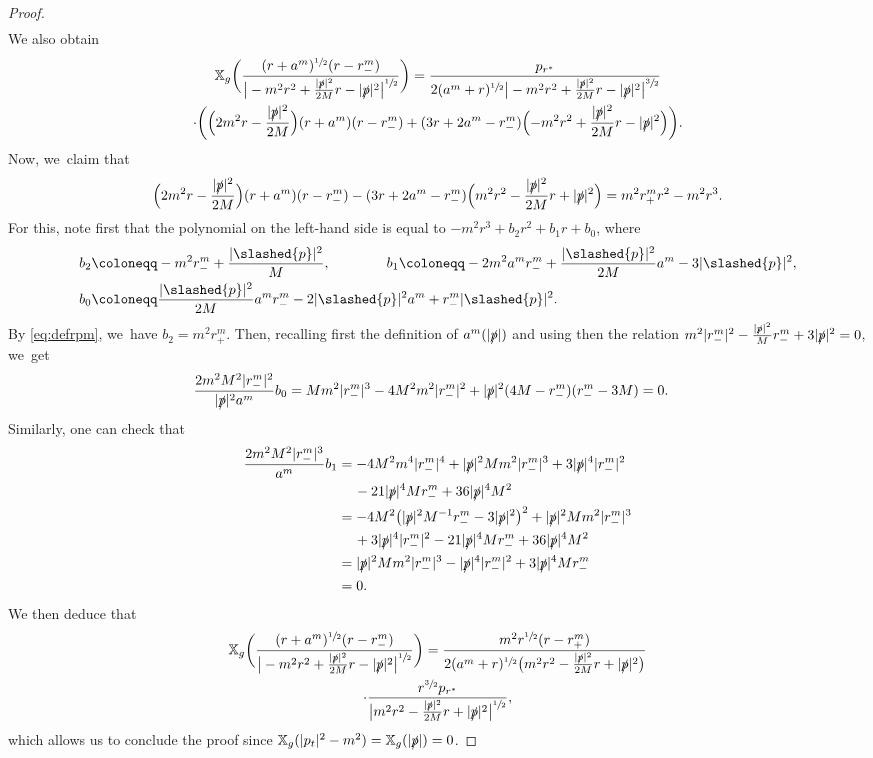 \documentclass[JEP,XML,SOM,Unicode,published]{cedram}
\theoremstyle{plain}
\theoremstyle{definition}
\newcommand\T{{\mathbb{X}}}
\begin{document}
\begin{proof}
\begin{align*}
\end{align*}
We also obtain
\begin{multline*}
\T_g \biggl(\frac{(r+a^{m})^{\sfrac{1}{2}}(r-r_-^m)}{\big| -m^2 r^2+\frac{|\slashed{p}|^2}{2M}r-|\slashed{p}|^2 \big|^{\sfrac{1}{2}}}\biggr)=\frac{p_{r^*} }{2(a^{m}+r)^{\sfrac{1}{2}}\big|-m^2 r^2+\frac{|\slashed{p}|^2}{2M}r-|\slashed{p}|^2\big|^{\sfrac{3}{2}}} \\
\cdot \biggl(\Bigl(2m^2 r-\frac{|\slashed{p}|^2}{2M}\Bigr)(r+a^{m})(r-r^{m}_-)+(3r+2a^{m}-r^{m}_-)\Bigl(-m^2 r^2+\frac{|\slashed{p}|^2}{2M}r-|\slashed{p}|^2\Bigr)\biggr).
\end{multline*}
Now, we~claim that
\[
\Bigl(2m^2 r-\frac{|\slashed{p}|^2}{2M}\Bigr)(r+a^{m})(r-r^{m}_-)-(3r+2a^{m}-r^{m}_-)\Bigl(m^2 r^2-\frac{|\slashed{p}|^2}{2M}r+|\slashed{p}|^2\Bigr)=m^2r^{m}_+r^2-m^2r^3.
\]
For this, note first that the polynomial on the left-hand side is equal to $-m^2r^3+b_2r^2+b_1r+b_0$, where
\begin{align*}
b_2 & \coloneqq -m^2r_-^m+\frac{|\slashed{p}|^2}{M},\qquad\qquad b_1 \coloneqq -2m^2a^mr_-^m+\frac{|\slashed{p}|^2}{2M}a^m -3 |\slashed{p}|^2, \\
b_0 & \coloneqq \frac{|\slashed{p}|^2}{2M}a^mr_-^m-2|\slashed{p}|^2a^m+r_-^m |\slashed{p}|^2.
\end{align*}
By \eqref{eq:defrpm}, we~have $b_2=m^2r_+^m$. Then, recalling first the definition of $a^{m}(|\slashed{p}|)$ and using then the relation $m^2|r_-^m|^2-\frac{|\slashed{p}|^2}{M}r_-^m+3|\slashed{p}|^2=0$, we~get
\begin{align*}
\frac{2m^2M^2|r_-^m|^2}{|\slashed{p}|^2 a^m} b_0 & = M m^2|r_-^m|^3-4M^2m^2|r_-^m|^2+|\slashed{p}|^2(4M-r_-^m)(r_-^m-3M) =0.
\end{align*}
Similarly, one can check that
\begin{align*}
\frac{2m^2M^2|r_-^m|^3}{a^m} b_1 & =-4M^2m^4|r_-^m|^4+|\slashed{p}|^2M m^2|r_-^m|^3+3|\slashed{p}|^4|r_-^m|^2 \\
& \quad \, -21 |\slashed{p}|^4 M r_-^m+36|\slashed{p}|^4 M^2 \\
& = -4M^2 \bigl(|\slashed{p}|^2 M^{-1}r_-^m-3|\slashed{p}|^2 \bigr)^2+|\slashed{p}|^2M m^2|r_-^m|^3 \\
& \quad \, +3|\slashed{p}|^4|r_-^m|^2-21 |\slashed{p}|^4 M r_-^m+36|\slashed{p}|^4 M^2 \\
& = |\slashed{p}|^2M m^2|r_-^m|^3-|\slashed{p}|^4|r_-^m|^2+3 |\slashed{p}|^4 M r_-^m \\
& =0.
\end{align*}
We then deduce that
\begin{multline*}
\T_g \biggl(\frac{(r+a^{m})^{\sfrac{1}{2}}(r-r_-^m)}{\big| -m^2 r^2+\frac{|\slashed{p}|^2}{2M}r-|\slashed{p}|^2 \big|^{\sfrac{1}{2}}}\biggr) = \frac{m^2 r^{\sfrac{1}{2}}(r-r^{m}_+)}{2(a^m+r)^{\sfrac{1}{2}}\bigl(m^2 r^2-\frac{|\slashed{p}|^2}{2M}r+|\slashed{p}|^2 \bigr)} \\
\cdot \frac{r^{\sfrac{3}{2}}p_{r^*}}{\big|m^2r^2-\frac{|\slashed{p}|^2}{2M}r+|\slashed{p}|^2\big|^{\sfrac{1}{2}}},
\end{multline*}
which allows us to conclude the proof since $\T_g (|p_t|^2-m^2)=\T_g(|\slashed{p}|)=0$.
\end{proof}
\end{document}
